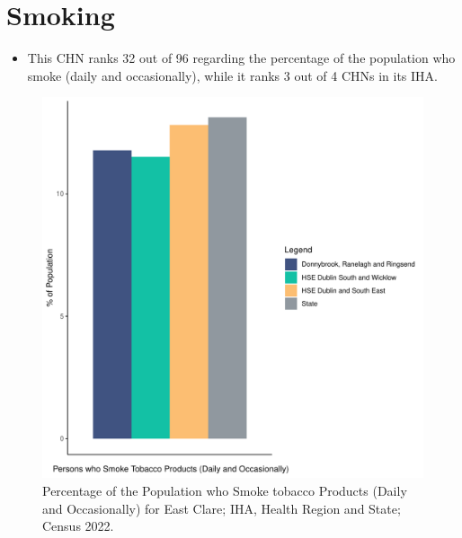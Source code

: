 \documentclass{article}
\begin{document}
\pagebreak

\section{Smoking}\label{sect:Smoking}
\begin{itemize}
\item This CHN ranks  32 out of 96 regarding the percentage of the population who smoke (daily and occasionally), while it ranks   3 out of 4 CHNs in its IHA.
\end{itemize}
\begin{figure}[H]
	\centering
	\includegraphics[width = 120mm]{../figures/SmokingED.pdf}
	\caption{Percentage of the Population who Smoke tobacco Products (Daily and Occasionally) for East Clare; IHA, Health Region and State; Census 2022.}
	\label{fig:2ae19629-1a6a-13a3-e055-000000000001}
	\end{figure}
	
\end{document}
